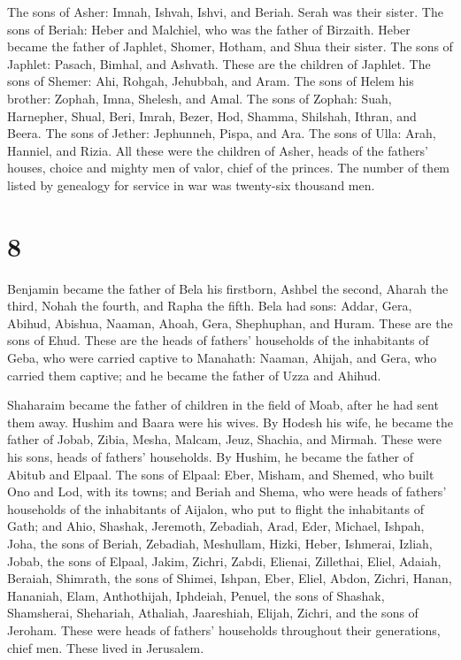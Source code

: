  The sons of Asher: Imnah, Ishvah, Ishvi, and Beriah. Serah
was their sister.  The sons of Beriah: Heber and Malchiel,
who was the father of Birzaith.  Heber became the father of
Japhlet, Shomer, Hotham, and Shua their sister.  The sons
of Japhlet: Pasach, Bimhal, and Ashvath. These are the children of
Japhlet.  The sons of Shemer: Ahi, Rohgah, Jehubbah, and
Aram.  The sons of Helem his brother: Zophah, Imna,
Shelesh, and Amal.  The sons of Zophah: Suah, Harnepher,
Shual, Beri, Imrah,  Bezer, Hod, Shamma, Shilshah, Ithran,
and Beera.  The sons of Jether: Jephunneh, Pispa, and Ara.
 The sons of Ulla: Arah, Hanniel, and Rizia. 
All these were the children of Asher, heads of the fathers' houses,
choice and mighty men of valor, chief of the princes. The number of them
listed by genealogy for service in war was twenty-six thousand men.

\hypertarget{section-7}{%
\section{8}\label{section-7}}

 Benjamin became the father of Bela his firstborn, Ashbel
the second, Aharah the third,  Nohah the fourth, and Rapha
the fifth.  Bela had sons: Addar, Gera, Abihud, 
Abishua, Naaman, Ahoah,  Gera, Shephuphan, and Huram.
 These are the sons of Ehud. These are the heads of fathers'
households of the inhabitants of Geba, who were carried captive to
Manahath:  Naaman, Ahijah, and Gera, who carried them
captive; and he became the father of Uzza and Ahihud.

 Shaharaim became the father of children in the field of
Moab, after he had sent them away. Hushim and Baara were his wives.
 By Hodesh his wife, he became the father of Jobab, Zibia,
Mesha, Malcam,  Jeuz, Shachia, and Mirmah. These were his
sons, heads of fathers' households.  By Hushim, he became
the father of Abitub and Elpaal.  The sons of Elpaal: Eber,
Misham, and Shemed, who built Ono and Lod, with its towns; 
and Beriah and Shema, who were heads of fathers' households of the
inhabitants of Aijalon, who put to flight the inhabitants of Gath;
 and Ahio, Shashak, Jeremoth,  Zebadiah, Arad,
Eder,  Michael, Ishpah, Joha, the sons of Beriah,
 Zebadiah, Meshullam, Hizki, Heber,  Ishmerai,
Izliah, Jobab, the sons of Elpaal,  Jakim, Zichri, Zabdi,
 Elienai, Zillethai, Eliel,  Adaiah, Beraiah,
Shimrath, the sons of Shimei,  Ishpan, Eber, Eliel,
 Abdon, Zichri, Hanan,  Hananiah, Elam,
Anthothijah,  Iphdeiah, Penuel, the sons of Shashak,
 Shamsherai, Shehariah, Athaliah,  Jaareshiah,
Elijah, Zichri, and the sons of Jeroham.  These were heads
of fathers' households throughout their generations, chief men. These
lived in Jerusalem.

